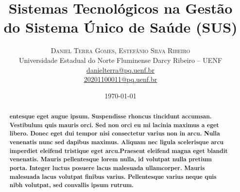 \documentclass[twoside]{article}
\title{\vspace{-10mm}\fontsize{18pt}{20pt}\selectfont\textbf{Sistemas Tecnológicos na Gestão do Sistema Único de Saúde (SUS)}}
\author{
\large
\textsc{Daniel Terra Gomes,} \textsc{Estefânio Silva Ribeiro}\\[2mm]
\large Universidade Estadual do Norte Fluminense Darcy Ribeiro – UENF\\[2mm]
\smallsize \href{mailto:danielterra@pq.uenf.br}{danielterra@pq.uenf.br}\\[2mm]
\smallsize \href{mailto:20201100011@pq.uenf.br}{20201100011@pq.uenf.br}\\[2mm]
\smallsize\date{\today}
}
\date{}
\begin{document}
\maketitle

\thispagestyle{fancy}


\begin{abstract}
  \textbf{entesque eget augue ipsum. Suspendisse rhoncus tincidunt accumsan. Vestibulum quis mauris orci. Sed non orci eu mi lacinia maximus a eget libero. Donec eget dui tempor nisi consectetur varius non in arcu. Nulla venenatis nunc sed dapibus maximus. Aliquam nec ligula scelerisque arcu imperdiet eleifend tristique eget arcu.Praesent eleifend magna eget blandit venenatis. Mauris pellentesque lorem nulla, id volutpat nulla pretium porta. Integer luctus posuere lacus malesuada ullamcorper. Mauris malesuada lacus volutpat finibus varius. Pellentesque varius neque quis nibh volutpat, sed convallis ipsum rutrum.}
\end{abstract}

\vspace{2mm}
\end{document}
